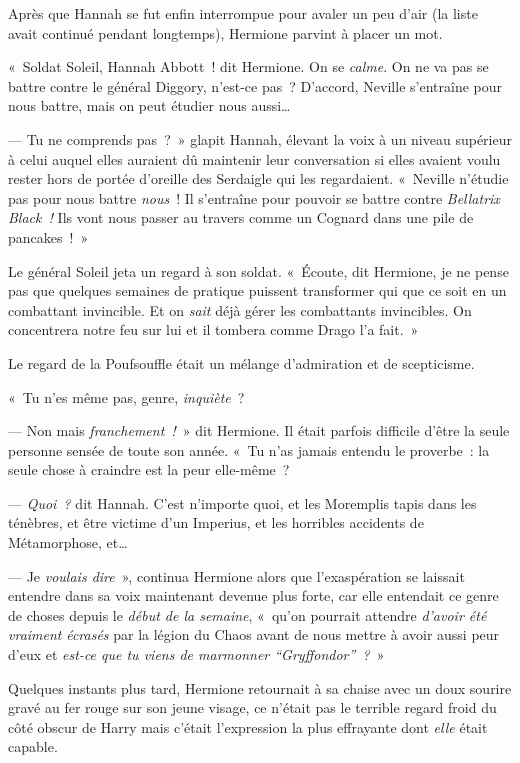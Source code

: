Après que Hannah se fut enfin interrompue pour avaler un peu d'air (la liste avait continué pendant longtemps), Hermione parvint à placer un mot.

«~Soldat Soleil, Hannah Abbott~! dit Hermione.
On se \emph{calme}.
On ne va pas se battre contre le général Diggory, n'est-ce pas~?
D'accord, Neville s'entraîne pour nous battre, mais on peut étudier nous aussi…

--- Tu ne comprends pas~?~»
glapit Hannah, élevant la voix à un niveau supérieur à celui auquel elles auraient dû maintenir leur conversation si elles avaient voulu rester hors de portée d'oreille des Serdaigle qui les regardaient.
«~Neville n'étudie pas pour nous battre \emph{nous}~!
Il s'entraîne pour pouvoir se battre contre \emph{Bellatrix Black~!} Ils vont nous passer au travers comme un Cognard dans une pile de pancakes~!~»

Le général Soleil jeta un regard à son soldat.
«~Écoute, dit Hermione, je ne pense pas que quelques semaines de pratique puissent transformer qui que ce soit en un combattant invincible.
Et on \emph{sait} déjà gérer les combattants invincibles.
On concentrera notre feu sur lui et il tombera comme Drago l'a fait.~»

Le regard de la Poufsouffle était un mélange d'admiration et de scepticisme.

«~Tu n'es même pas, genre, \emph{inquiète}~?

--- Non mais \emph{franchement~!}~» dit Hermione.
Il était parfois difficile d'être la seule personne sensée de toute son année.
«~Tu n'as jamais entendu le proverbe~: la seule chose à craindre est la peur elle-même~?

--- \emph{Quoi~?} dit Hannah.
C'est n'importe quoi, et les Moremplis tapis dans les ténèbres, et être victime d'un Imperius, et les horribles accidents de Métamorphose, et…

--- Je \emph{voulais dire}~», continua Hermione alors que l'exaspération se laissait entendre dans sa voix maintenant devenue plus forte, car elle entendait ce genre de choses depuis le \emph{début de la semaine}, «~qu'on pourrait attendre \emph{d'avoir été} \emph{vraiment} \emph{écrasés} par la légion du Chaos avant de nous mettre à avoir aussi peur d'eux et \emph{est-ce que tu viens de marmonner “Gryffondor”~?}~»

Quelques instants plus tard, Hermione retournait à sa chaise avec un doux sourire gravé au fer rouge sur son jeune visage, ce n'était pas le terrible regard froid du côté obscur de Harry mais c'était l'expression la plus effrayante dont \emph{elle} était capable.


